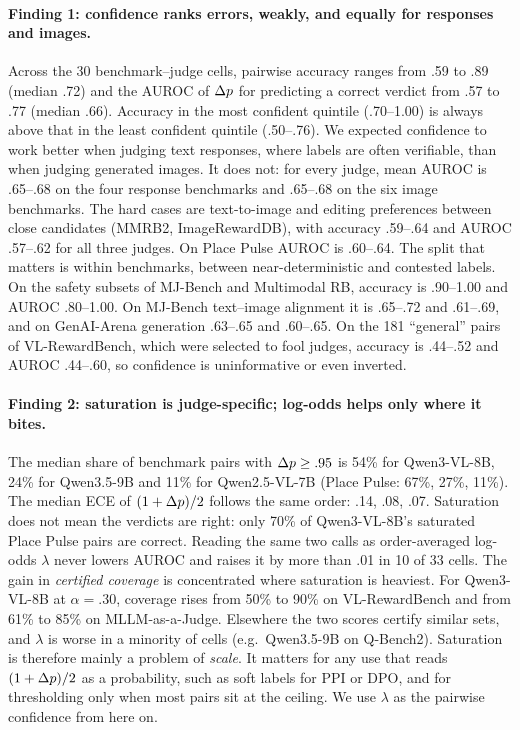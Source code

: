 \paragraph{Finding 1: confidence ranks errors, weakly, and equally for responses and images.}
Across the 30 benchmark--judge cells, pairwise accuracy ranges from .59 to .89 (median .72) and the AUROC of $\Delta p$ for predicting a correct verdict from .57 to .77 (median .66). Accuracy in the most confident quintile (.70--1.00) is always above that in the least confident quintile (.50--.76).
We expected confidence to work better when judging text responses, where labels are often verifiable, than when judging generated images. It does not: for every judge, mean AUROC is .65--.68 on the four response benchmarks and .65--.68 on the six image benchmarks.
The hard cases are text-to-image and editing preferences between close candidates (MMRB2, ImageRewardDB), with accuracy .59--.64 and AUROC .57--.62 for all three judges. On Place Pulse AUROC is .60--.64.
The split that matters is within benchmarks, between near-deterministic and contested labels. On the safety subsets of MJ-Bench and Multimodal RB, accuracy is .90--1.00 and AUROC .80--1.00. On MJ-Bench text--image alignment it is .65--.72 and .61--.69, and on GenAI-Arena generation .63--.65 and .60--.65. On the 181 ``general'' pairs of VL-RewardBench, which were selected to fool judges, accuracy is .44--.52 and AUROC .44--.60, so confidence is uninformative or even inverted.

\paragraph{Finding 2: saturation is judge-specific; log-odds helps only where it bites.}
The median share of benchmark pairs with $\Delta p\ge.95$ is 54\% for Qwen3-VL-8B, 24\% for Qwen3.5-9B and 11\% for Qwen2.5-VL-7B (Place Pulse: 67\%, 27\%, 11\%). The median ECE of $(1+\Delta p)/2$ follows the same order: .14, .08, .07.
Saturation does not mean the verdicts are right: only 70\% of Qwen3-VL-8B's saturated Place Pulse pairs are correct.
Reading the same two calls as order-averaged log-odds $\lambda$ never lowers AUROC and raises it by more than .01 in 10 of 33 cells. The gain in \emph{certified coverage} is concentrated where saturation is heaviest. For Qwen3-VL-8B at $\alpha=.30$, coverage rises from 50\% to 90\% on VL-RewardBench and from 61\% to 85\% on MLLM-as-a-Judge. Elsewhere the two scores certify similar sets, and $\lambda$ is worse in a minority of cells (e.g.\ Qwen3.5-9B on Q-Bench2).
Saturation is therefore mainly a problem of \emph{scale}. It matters for any use that reads $(1+\Delta p)/2$ as a probability, such as soft labels for PPI or DPO, and for thresholding only when most pairs sit at the ceiling. We use $\lambda$ as the pairwise confidence from here on.

